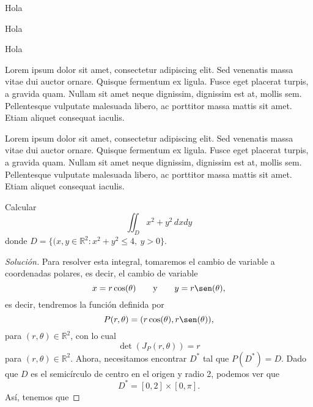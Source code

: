 \documentclass[a4]{aleph-notas-beta}
\begin{document}
\begin{cor}
    Hola
\end{cor}

\begin{cor}[Título]
    Hola
\end{cor}

\begin{lem}
    Hola
\end{lem}

\begin{obs}
    Lorem ipsum dolor sit amet, consectetur adipiscing elit. Sed venenatis massa vitae dui auctor ornare. Quisque fermentum ex ligula. Fusce eget placerat turpis, a gravida quam. Nullam sit amet neque dignissim, dignissim est at, mollis sem. Pellentesque vulputate malesuada libero, ac porttitor massa mattis sit amet. Etiam aliquet consequat iaculis.
\end{obs}

\begin{ejem}
    Lorem ipsum dolor sit amet, consectetur adipiscing elit. Sed venenatis massa vitae dui auctor ornare. Quisque fermentum ex ligula. Fusce eget placerat turpis, a gravida quam. Nullam sit amet neque dignissim, dignissim est at, mollis sem. Pellentesque vulputate malesuada libero, ac porttitor massa mattis sit amet. Etiam aliquet consequat iaculis.
\end{ejem}

\begin{ejer}
    Calcular \[\iint_D x^2+y^2\,dxdy\] donde $D=\{(x,y\in\mathbb{R}^2:x^2+y^2\leq 4,\ y>0\}$.
\end{ejer}

\begin{proof}[Solución]
    Para resolver esta integral, tomaremos el cambio de variable a coordenadas polares, es decir, el cambio de variable
    \[
        x=r\cos(\theta)
        \texty
        y=r\sen(\theta),
    \]
    es decir, tendremos la función definida por
    \[
        P(r,\theta) = (r\cos(\theta) , r\sen(\theta)),
    \]
    para $(r,\theta)\in\mathbb{R}^2$, con lo cual
    \[
        \det(J_P(r,\theta)) = r
    \]
    para $(r,\theta)\in\mathbb{R}^2$. Ahora, necesitamos encontrar $D^*$ tal que $P(D^*)=D$. Dado que $D$ es el semicírculo de centro en el origen y radio 2, podemos ver que
    \[
        D^*=[0,2]\times [0,\pi].
    \]
    Así, tenemos que
\end{proof}
\end{document}
